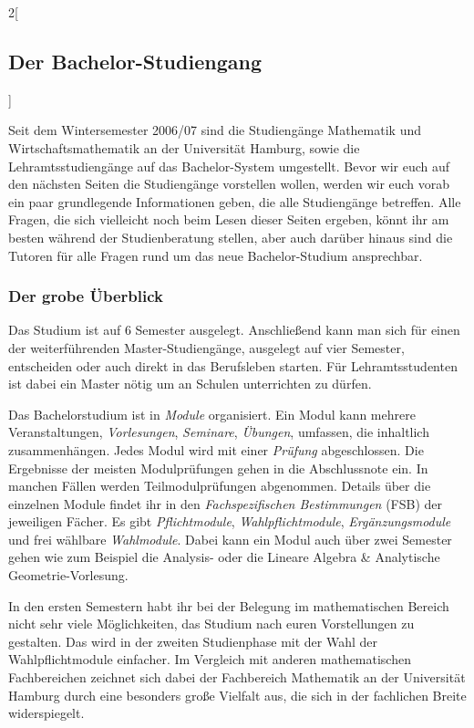 \begin{multicols}{2}[\subsection{Der Bachelor-Studiengang}]

Seit dem Wintersemester 2006/07 sind die Studiengänge Mathematik und
Wirtschaftsmathematik an der Universität Hamburg, sowie die
Lehramtsstudiengänge auf das Bachelor-System umgestellt. Bevor wir euch auf den
nächsten Seiten die Studiengänge vorstellen wollen, werden wir euch vorab ein
paar grundlegende Informationen geben, die alle Studiengänge betreffen. Alle
Fragen, die sich vielleicht noch beim Lesen dieser Seiten ergeben, könnt ihr am
besten während der Studienberatung stellen, aber auch darüber hinaus sind die
Tutoren für alle Fragen rund um das neue Bachelor-Studium ansprechbar.

\subsubsection{Der grobe Überblick}

Das Studium ist auf 6 Semester ausgelegt. Anschließend kann man sich für einen
der weiterführenden Master-Studiengänge, ausgelegt auf vier Semester,
entscheiden oder auch direkt in das Berufsleben starten. Für Lehramtsstudenten
ist dabei ein Master nötig um an Schulen unterrichten zu dürfen.

Das Bachelorstudium ist in \emph{Module} organisiert. Ein Modul kann mehrere
Veranstaltungen, \emph{Vorlesungen}, \emph{Seminare}, \emph{Übungen}, umfassen,
die inhaltlich zusammenhängen.  Jedes Modul wird mit einer \emph{Prüfung}
abgeschlossen.  Die Ergebnisse der meisten Modulprüfungen gehen in die
Abschlussnote ein. In manchen Fällen werden Teilmodulprüfungen abgenommen.
Details über die einzelnen Module findet ihr in den \emph{Fachspezifischen
Bestimmungen} (FSB) der jeweiligen Fächer.  Es gibt \emph{Pflichtmodule},
\emph{Wahlpflichtmodule}, \emph{Ergänzungsmodule} und frei wählbare
\emph{Wahlmodule}.  Dabei kann ein Modul auch über zwei Semester gehen wie zum
Beispiel die Analysis- oder die Lineare Algebra \& Analytische
Geometrie-Vorlesung. 

In den ersten Semestern habt ihr bei der Belegung im mathematischen Bereich
nicht sehr viele Möglichkeiten, das Studium nach euren Vorstellungen zu
gestalten. Das wird in der zweiten Studienphase mit der Wahl der
Wahlpflichtmodule einfacher. Im Vergleich mit anderen mathematischen
Fachbereichen zeichnet sich dabei der Fachbereich Mathematik an der Universität
Hamburg durch eine besonders große Vielfalt aus, die sich in der fachlichen
Breite widerspiegelt.


\end{multicols}
